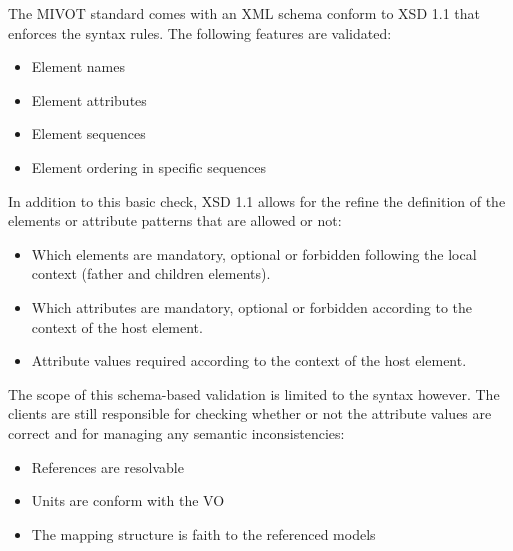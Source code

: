 The MIVOT standard comes with an XML schema conform to XSD 1.1 \citep{std:xsd1.1} that enforces the syntax rules. 
The following features are validated:

\begin{itemize} 
  \item Element names 
  \item Element attributes
  \item Element sequences 
  \item Element ordering in specific sequences
\end{itemize}

In addition to this basic check, XSD 1.1 allows for the refine the definition of the elements or attribute  patterns that are allowed or not:

\begin{itemize} 
  \item Which elements are mandatory, optional  or forbidden following the local context  (father and children elements).
  \item Which attributes are mandatory, optional  or forbidden according to the context of the host element.
  \item Attribute values required according to the context of the host element.
\end{itemize}
 
The scope of this schema-based validation is limited to the syntax however. 
The clients are still responsible for checking whether or not the attribute values are correct and for managing any semantic inconsistencies:

\begin{itemize} 
  \item References are resolvable
  \item Units are conform with the VO
  \item The mapping structure is faith to the referenced models
\end{itemize}


